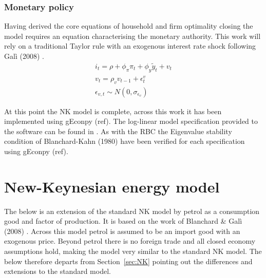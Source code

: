 \documentclass[12pt,a4paper,english]{article} %
\let\oldsection\section
\renewcommand\section{\clearpage\oldsection}
\begin{document}
	\subsubsection{Monetary policy}
	Having derived the core equations of household and firm optimality closing the model requires an equation characterising the monetary authority. This work will rely on a traditional Taylor rule with an exogenous interest rate shock following Galì (2008) \cite{gali_monetary_2008}.
	\begin{equation}
		\begin{aligned}
			i_t = \rho + \phi_{\pi} \pi_t + \phi_{y} \tilde{y}_t + v_t \\
			v_t = \rho_v v_{t-1} + \epsilon_t^v \\
			\epsilon_{v,t} \sim N(0, \sigma_{\epsilon_v})
		\end{aligned}
	\end{equation}
	
	At this point the NK model is complete, across this work it has been implemented using gEconpy (ref). The log-linear model specification provided to the software can be found in . As with the RBC the Eigenvalue stability condition of Blanchard-Kahn (1980) have been verified for each specification using gEconpy \cite{blanchard_solution_1980} (ref).

	\section{New-Keynesian energy model}
	The below is an extension of the standard NK model by petrol as a consumption good and factor of production. It is based on the work of Blanchard \& Galì (2008) \cite{blanchard_macroeconomic_2007}. Across this model petrol is assumed to be an import good with an exogenous price. Beyond petrol there is no foreign trade and all closed economy assumptions hold, making the model very similar to the standard NK model. The below therefore departs from Section~\ref{sec:NK} pointing out the differences and extensions to the standard model.
	
\end{document}
